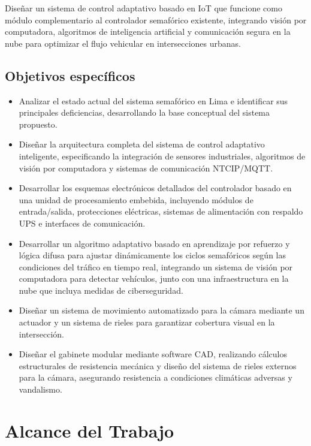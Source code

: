 \documentclass[12pt,a4paper,oneside]{report}
\begin{document}
Diseñar un sistema de control adaptativo basado en IoT que funcione como módulo complementario al controlador semafórico existente, integrando visión por computadora, algoritmos de inteligencia artificial y comunicación segura en la nube para optimizar el flujo vehicular en intersecciones urbanas.

\subsection{Objetivos específicos}\label{objetivos-especuxedficos}

\begin{itemize}
\item
  Analizar el estado actual del sistema semafórico en Lima e identificar sus principales deficiencias, desarrollando la base conceptual del sistema propuesto.
\item
  Diseñar la arquitectura completa del sistema de control adaptativo inteligente, especificando la integración de sensores industriales, algoritmos de visión por computadora y sistemas de comunicación NTCIP/MQTT.
\item
  Desarrollar los esquemas electrónicos detallados del controlador basado en una unidad de procesamiento embebida, incluyendo módulos de entrada/salida, protecciones eléctricas, sistemas de alimentación con respaldo UPS e interfaces de comunicación.
\item
  Desarrollar un algoritmo adaptativo basado en aprendizaje por refuerzo y lógica difusa para ajustar dinámicamente los ciclos semafóricos según las condiciones del tráfico en tiempo real, integrando un sistema de visión por computadora para detectar vehículos, junto con una infraestructura en la nube que incluya medidas de ciberseguridad.
\item
  Diseñar un sistema de movimiento automatizado para la cámara mediante un actuador y un sistema de rieles para garantizar cobertura visual en la intersección.
\item
  Diseñar el gabinete modular mediante software CAD, realizando cálculos estructurales de resistencia mecánica y diseño del sistema de rieles externos para la cámara, asegurando resistencia a condiciones climáticas adversas y vandalismo.
\end{itemize}

\section{Alcance del Trabajo}\label{alcance-del-trabajo}
\end{document}

